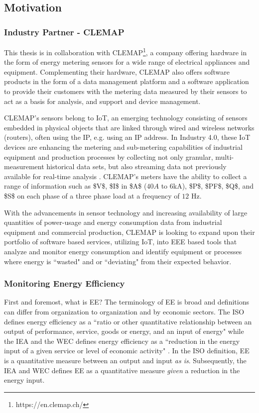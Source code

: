 \subsection{Motivation}

\subsubsection{Industry Partner - CLEMAP}
This thesis is in collaboration with \ac{CLEMAP}\footnote[1]{https://en.clemap.ch/}, a company offering hardware in the form of energy metering sensors for a wide range of electrical appliances and equipment. Complementing their hardware, CLEMAP also offers software products in the form of a data management platform and a software application to provide their customers with the metering data measured by their sensors to act as a basis for analysis, and support and device management.

CLEMAP’s sensors belong to \ac{IoT}, an emerging technology consisting of sensors embedded in physical objects that are linked through wired and wireless networks (routers), often using the \ac{IP}, e.g. using an IP address. In Industry 4.0, these IoT devices are enhancing the metering and sub-metering capabilities of industrial equipment and production processes by collecting not only granular, multi-measurement historical data sets, but also streaming data not previously available for real-time analysis \cite{iot-1}. CLEMAP's meters have the ability to collect a range of information such as \ac{$V$}, \ac{$I$} in \ac{$A$} ($40A$ to $6$kA), \ac{$P$}, \ac{$PF$}, \ac{$Q$}, and \ac{$S$} on each phase of a three phase load at a frequency of $12$ \ac{Hz}. 

With the advancements in sensor technology and increasing availability of large quantities of power-usage and energy consumption data from industrial equipment and commercial production, CLEMAP is looking to expand upon their portfolio of software based services, utilizing IoT, into \ac{EEE} based tools that analyze and monitor energy consumption and identify equipment or processes where energy is ``wasted" and or ``deviating" from their expected behavior.

\subsubsection{Monitoring Energy Efficiency}

First and foremost, what is \ac{EE}? The terminology of EE is broad and definitions can differ from organization to organization and by economic sectors. The \ac{ISO} defines energy efficiency as a ``ratio or other quantitative relationship between an output of performance, service, goods or energy, and an input of energy" \cite{ISO} while the \ac{IEA} and the \ac{WEC} defines energy efficiency as a ``reduction in the energy input of a given service or level of economic activity" \cite{iea-wec}. In the ISO definition, EE is a quantitative measure between an output and input \textit{as is}. Subsequently, the IEA and WEC defines EE as a quantitative measure \textit{given} a reduction in the energy input.

